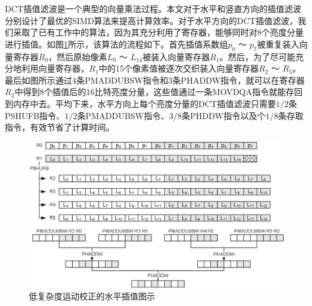 DCT插值滤波是一个典型的向量乘法过程。本文对于水平和竖直方向的插值滤波分别设计了最优的SIMD算法来提高计算效率。对于水平方向的DCT插值滤波，我们采取了已有工作\supercite{Yan-VCIP2012}中的算法，因为其充分利用了寄存器，能够同时对8个亮度分量进行插值。如图\ref{fig:DCT-IF_luma}所示，该算法的流程如下。首先插值系数组$p_0$ ～ $p_7$被重复装入向量寄存器$R_0$，然后原始像素$L_0$ ～ $L_{14}$被装入向量寄存器$R_1$。然后，为了尽可能充分地利用向量寄存器，$R_1$中的15个像素值被逐次交织装入向量寄存器$R_2$ ～ $R_5$。最后如图所示通过4条PMADDUBSW指令和3条PHADDW指令，就可以在寄存器$R_2$中得到8个插值后的16比特亮度分量，这些值通过一条MOVDQA指令就能存回到内存中去。平均下来，水平方向上每个亮度分量的DCT插值滤波只需要$1/2$条PSHUFB指令、$1/2$条PMADDUBSW指令、$3/8$条PHDDW指令以及个$1/8$条存取指令，有效节省了计算时间。

\begin{figure}[!tp]
	\centering
	\includegraphics[width = 0.95\linewidth]{eps/DCT-IF_luma}
	\caption{\label{fig:DCT-IF_luma}
		低复杂度运动校正的水平插值图示}
\end{figure}

